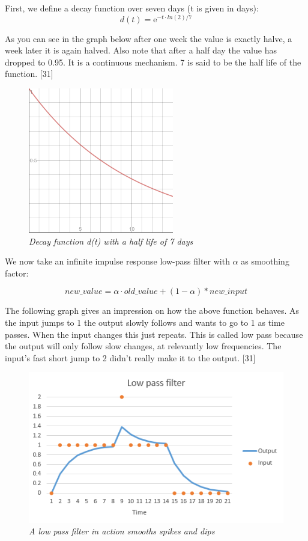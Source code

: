 First, we define a decay function over seven days (t is given in days):\\

\begin{equation}
d(t) =  \mathrm{e}^{-t \cdot  ln(2) / 7}  
\end{equation}

As you can see in the graph below after one week the value is exactly halve, a week later it is again halved. Also note that after a half day the value has dropped to 0.95. It is a continuous mechanism. 7 is said to be the half life of the function. [31]\\


\begin{figure}
\centering
\includegraphics{figures/halflife}
\medskip
\caption{\textit{Decay function d(t) with a half life of 7 days }}
\small
\end{figure}


We now take an infinite impulse response low-pass filter with $\alpha$ as smoothing factor:

\begin{equation}
new\_value = \alpha \cdot old\_value + (1-\alpha) * new\_input
\end{equation}

The following graph gives an impression on how the above function behaves. As the input jumps to 1 the output slowly follows and wants to go to 1 as time passes. When the input changes this just repeats. This is called low pass because the output will only follow slow changes, at relevantly low frequencies. The input’s fast short jump to 2 didn’t really make it to the output. [31]\\

\begin{figure}
\centering
\includegraphics{figures/low-pass}
\caption{\textit{A low pass filter in action smooths spikes and dips}}
\small
\end{figure}


